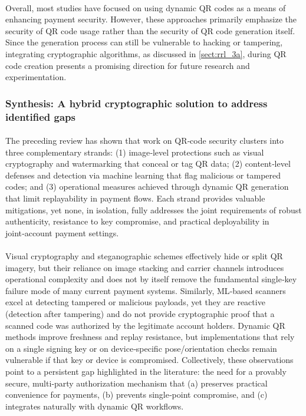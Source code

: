 \documentclass[a4paper]{scl-article}
\begin{document}
\paragraph{}Overall, most studies have focused on using dynamic QR codes as a means of enhancing payment security. However, these approaches primarily emphasize the security of QR code usage rather than the security of QR code generation itself. Since the generation process can still be vulnerable to hacking or tampering, integrating cryptographic algorithms, as discussed in \ref{sect:rrl_3a}, during QR code creation presents a promising direction for future research and experimentation.

\subsubsection{Synthesis: A hybrid cryptographic solution to address identified gaps}
\label{sect:rrl_3d}
\paragraph{}The preceding review has shown that work on QR‑code security clusters into three complementary strands: (1) image‑level protections such as visual cryptography and watermarking that conceal or tag QR data; (2) content‑level defenses and detection via machine learning that flag malicious or tampered codes; and (3) operational measures achieved through dynamic QR generation that limit replayability in payment flows. Each strand provides valuable mitigations, yet none, in isolation, fully addresses the joint requirements of robust authenticity, resistance to key compromise, and practical deployability in joint‑account payment settings.

\paragraph{}Visual cryptography and steganographic schemes effectively hide or split QR imagery, but their reliance on image stacking and carrier channels introduces operational complexity and does not by itself remove the fundamental single‑key failure mode of many current payment systems. Similarly, ML‑based scanners excel at detecting tampered or malicious payloads, yet they are reactive (detection after tampering) and do not provide cryptographic proof that a scanned code was authorized by the legitimate account holders. Dynamic QR methods improve freshness and replay resistance, but implementations that rely on a single signing key or on device‑specific pose/orientation checks remain vulnerable if that key or device is compromised. Collectively, these observations point to a persistent gap highlighted in the literature: the need for a provably secure, multi‑party authorization mechanism that (a) preserves practical convenience for payments, (b) prevents single‑point compromise, and (c) integrates naturally with dynamic QR workflows.
\end{document}
